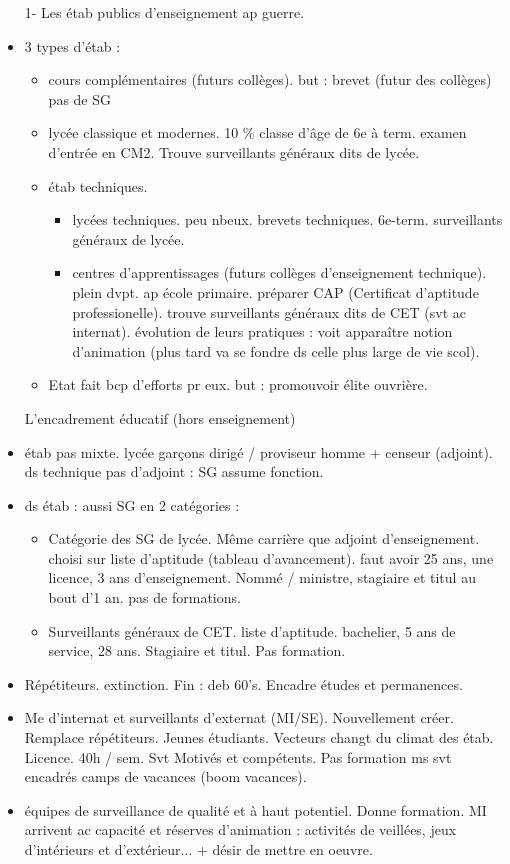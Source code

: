 \documentclass[12pt]{article}
\begin{document}
\begin{itemize}
1- Les étab publics d'enseignement ap guerre.
\item 3 types d'étab : 
\begin{itemize}
\item cours complémentaires (futurs collèges). but : brevet (futur des collèges) pas de SG
\item lycée classique et modernes. 10 \% classe d'âge de 6e à term. examen d'entrée en CM2. Trouve surveillants généraux dits de lycée.
\item étab techniques.
\begin{itemize}
\item lycées techniques. peu nbeux. brevets techniques. 6e-term. surveillants généraux de lycée.
\item centres d'apprentissages (futurs collèges d'enseignement technique). plein dvpt. ap école primaire. préparer CAP (Certificat d'aptitude professionelle). trouve surveillants généraux dits de CET (svt ac internat). évolution de leurs pratiques : voit apparaître notion d'animation (plus tard va se fondre ds celle plus large de vie scol).\\
\end{itemize}
\item Etat fait bcp d'efforts pr eux. but : promouvoir élite ouvrière.
\end{itemize}

L'encadrement éducatif (hors enseignement)
\item étab pas mixte. lycée garçons dirigé / proviseur homme + censeur (adjoint). ds technique pas d'adjoint : SG assume fonction.
\item ds étab : aussi SG en 2 catégories : 
\begin{itemize}
\item Catégorie des SG de lycée. Même carrière que adjoint d'enseignement. choisi sur liste d'aptitude (tableau d'avancement). faut avoir 25 ans, une licence, 3 ans d'enseignement. Nommé / ministre, stagiaire et titul au bout d'1 an. pas de formations.
\item Surveillants généraux de CET. liste d'aptitude. bachelier, 5 ans de service, 28 ans. Stagiaire et titul. Pas formation.
\end{itemize}

\item Répétiteurs. extinction. Fin : deb 60's. Encadre études et permanences.
\item Me d'internat et surveillants d'externat (MI/SE). Nouvellement créer. Remplace répétiteurs. Jeunes étudiants. Vecteurs changt du climat des étab. Licence. 40h / sem. Svt Motivés et compétents. Pas formation ms svt encadrés camps de vacances (boom vacances).
\item équipes de surveillance de qualité et à haut potentiel. Donne formation. MI arrivent ac capacité et réserves d'animation : activités de veillées, jeux d'intérieurs et d'extérieur... + désir de mettre en oeuvre.



\end{itemize}
\end{document}
